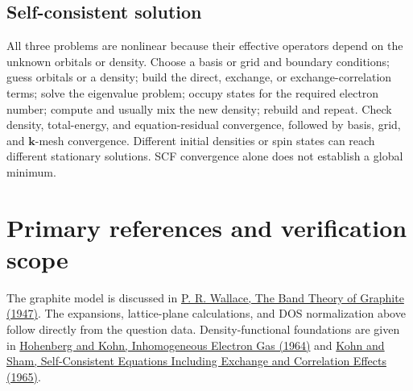\subsection*{Self-consistent solution}
All three problems are nonlinear because their effective operators depend on the unknown orbitals or density. Choose a basis or grid and boundary conditions; guess orbitals or a density; build the direct, exchange, or exchange-correlation terms; solve the eigenvalue problem; occupy states for the required electron number; compute and usually mix the new density; rebuild and repeat. Check density, total-energy, and equation-residual convergence, followed by basis, grid, and $\mathbf k$-mesh convergence. Different initial densities or spin states can reach different stationary solutions. SCF convergence alone does not establish a global minimum.

\section*{Primary references and verification scope}
The graphite model is discussed in
\href{https://doi.org/10.1103/PhysRev.71.622}{P. R. Wallace, The Band Theory of Graphite (1947)}.
The expansions, lattice-plane calculations, and DOS normalization above follow directly from the question data.
Density-functional foundations are given in
\href{https://doi.org/10.1103/PhysRev.136.B864}{Hohenberg and Kohn, Inhomogeneous Electron Gas (1964)}
and
\href{https://doi.org/10.1103/PhysRev.140.A1133}{Kohn and Sham, Self-Consistent Equations Including Exchange and Correlation Effects (1965)}.
